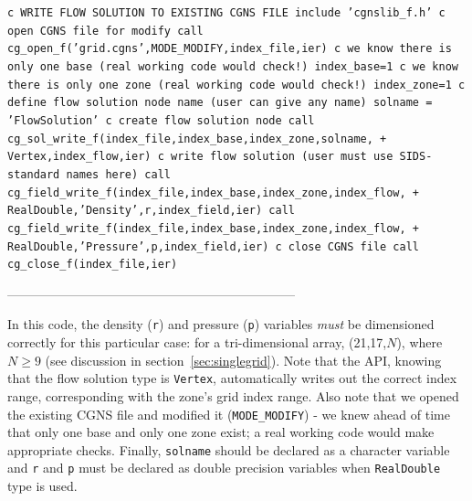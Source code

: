 \documentclass[12pt]{article}
\begin{document}
{\tt \noindent c  WRITE FLOW SOLUTION TO EXISTING CGNS FILE
\newline\indent      include 'cgnslib\_f.h'
\newline c  open CGNS file for modify
\newline\indent      call cg\_open\_f('grid.cgns',MODE\_MODIFY,index\_file,ier)
\newline c  we know there is only one base (real working code would check!)
\newline\indent      index\_base=1
\newline c  we know there is only one zone (real working code would check!)
\newline\indent      index\_zone=1
\newline c  define flow solution node name (user can give any name)
\newline\indent      solname = 'FlowSolution'
\newline c  create flow solution node
\newline\indent      call cg\_sol\_write\_f(index\_file,index\_base,index\_zone,solname,
\newline + \indent Vertex,index\_flow,ier)
\newline c  write flow solution (user must use SIDS-standard names here)
\newline\indent      call cg\_field\_write\_f(index\_file,index\_base,index\_zone,index\_flow,
\newline + \indent RealDouble,'Density',r,index\_field,ier)
\newline\indent      call cg\_field\_write\_f(index\_file,index\_base,index\_zone,index\_flow,
\newline + \indent RealDouble,'Pressure',p,index\_field,ier)
\newline c  close CGNS file
\newline\indent      call cg\_close\_f(index\_file,ier)}

--------------------------------------------------------------------

In this code, the density ({\tt r}) and pressure
({\tt p}) variables {\it must} be dimensioned
correctly for this particular case:  for a tri-dimensional array,
(21,17,$N$), where $N \geq 9$
(see discussion in section~\ref{sec:singlegrid}).  
Note that the API, knowing that the flow solution type is 
{\tt Vertex}, automatically writes out the correct index
range, corresponding with the zone's grid index range.
Also note that we opened the existing CGNS file and modified it 
({\tt MODE\_MODIFY}) - we
knew ahead of time that only one base and only one zone exist;
a real working code would make appropriate checks.  Finally,
{\tt solname} should be declared as a character variable and
{\tt r} and {\tt p} must be declared as double precision variables when
{\tt RealDouble} type is used.
\end{document}
